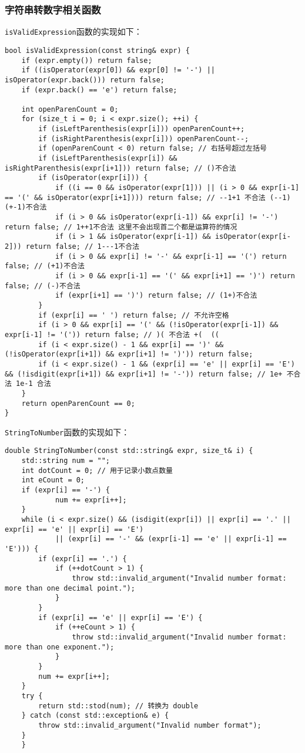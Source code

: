 \documentclass[UTF8]{ctexart}
\begin{document}
\subsubsection{字符串转数字相关函数}
\texttt{isValidExpression}函数的实现如下：
\begin{lstlisting}
bool isValidExpression(const string& expr) {
    if (expr.empty()) return false;
    if ((isOperator(expr[0]) && expr[0] != '-') || isOperator(expr.back())) return false;
    if (expr.back() == 'e') return false;

    int openParenCount = 0;
    for (size_t i = 0; i < expr.size(); ++i) {
        if (isLeftParenthesis(expr[i])) openParenCount++;
        if (isRightParenthesis(expr[i])) openParenCount--;
        if (openParenCount < 0) return false; // 右括号超过左括号
        if (isLeftParenthesis(expr[i]) && isRightParenthesis(expr[i+1])) return false; // ()不合法
        if (isOperator(expr[i])) {
            if ((i == 0 && isOperator(expr[1])) || (i > 0 && expr[i-1] == '(' && isOperator(expr[i+1]))) return false; // --1+1 不合法 (--1) (+-1)不合法
            if (i > 0 && isOperator(expr[i-1]) && expr[i] != '-') return false; // 1++1不合法 这里不会出现首二个都是运算符的情况
            if (i > 1 && isOperator(expr[i-1]) && isOperator(expr[i-2])) return false; // 1---1不合法
            if (i > 0 && expr[i] != '-' && expr[i-1] == '(') return false; // (+1)不合法
            if (i > 0 && expr[i-1] == '(' && expr[i+1] == ')') return false; // (-)不合法
            if (expr[i+1] == ')') return false; // (1+)不合法
        }
        if (expr[i] == ' ') return false; // 不允许空格
        if (i > 0 && expr[i] == '(' && (!isOperator(expr[i-1]) && expr[i-1] != '(')) return false; // )( 不合法 +(  ((
        if (i < expr.size() - 1 && expr[i] == ')' && (!isOperator(expr[i+1]) && expr[i+1] != ')')) return false; 
        if (i < expr.size() - 1 && (expr[i] == 'e' || expr[i] == 'E') && (!isdigit(expr[i+1]) && expr[i+1] != '-')) return false; // 1e+ 不合法 1e-1 合法
    }
    return openParenCount == 0;
}
\end{lstlisting}
\texttt{StringToNumber}函数的实现如下：
\begin{lstlisting}
double StringToNumber(const std::string& expr, size_t& i) {
    std::string num = "";
    int dotCount = 0; // 用于记录小数点数量
    int eCount = 0;
    if (expr[i] == '-') {
            num += expr[i++];
    }
    while (i < expr.size() && (isdigit(expr[i]) || expr[i] == '.' || expr[i] == 'e' || expr[i] == 'E')
            || (expr[i] == '-' && (expr[i-1] == 'e' || expr[i-1] == 'E'))) {
        if (expr[i] == '.') {
            if (++dotCount > 1) {
                throw std::invalid_argument("Invalid number format: more than one decimal point.");
            }
        }
        if (expr[i] == 'e' || expr[i] == 'E') {
            if (++eCount > 1) {
                throw std::invalid_argument("Invalid number format: more than one exponent.");
            }
        }
        num += expr[i++];
    }
    try {
        return std::stod(num); // 转换为 double
    } catch (const std::exception& e) {
        throw std::invalid_argument("Invalid number format");
    }
    }   
\end{lstlisting}
\end{document}
